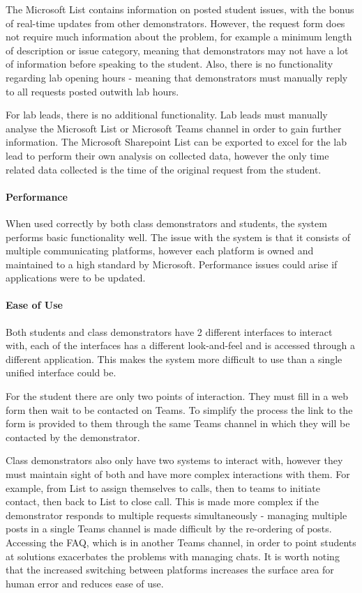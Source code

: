 The Microsoft List contains information on posted student issues, with the bonus of real-time updates from other demonstrators. However, the request form does not require much information about the problem, for example a minimum length of description or issue category, meaning that demonstrators may not have a lot of information before speaking to the student. Also, there is no functionality regarding lab opening hours - meaning that demonstrators must manually reply to all requests posted outwith lab hours.

For lab leads, there is no additional functionality. Lab leads must manually analyse the Microsoft List or Microsoft Teams \cite{teams} channel in order to gain further information. The Microsoft Sharepoint List can be exported to excel for the lab lead to perform their own analysis on collected data, however the only time related data collected is the time of the original request from the student.

\paragraph{Performance}  
When used correctly by both class demonstrators and students, the system performs basic functionality well. The issue with the system is that it consists of multiple communicating platforms, however each platform is owned and maintained to a high standard by Microsoft. Performance issues could arise if applications were to be updated.

\paragraph{Ease of Use} 

Both students and class demonstrators have 2 different interfaces to interact with, each of the interfaces has a different look-and-feel and is accessed through a different application. This makes the system more difficult to use than a single unified interface could be.

For the student there are only two points of interaction. They must fill in a web form then wait to be contacted on Teams. To simplify the process the link to the form is provided to them through the same Teams channel in which they will be contacted by the demonstrator.

Class demonstrators also only have two systems to interact with, however they must maintain sight of both and have more complex interactions with them. For example, from List to assign themselves to calls, then to teams to initiate contact, then back to List to close call. This is made more complex if the demonstrator responds to multiple requests simultaneously - managing multiple posts in a single Teams channel is made difficult by the re-ordering of posts. Accessing the FAQ, which is in another Teams channel, in order to point students at solutions exacerbates the problems with managing chats. It is worth noting that the increased switching between platforms increases the surface area for human error and reduces ease of use.


